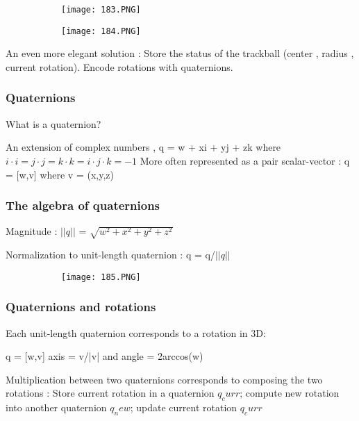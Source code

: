 \documentclass{article}
\begin{document}
\begin{figure}[ht!]
  \centering
  \begin{subfigure}[b]{0.4\linewidth}
    \texttt{[image: 183.PNG]}
  \end{subfigure}
  \begin{subfigure}[b]{0.4\textwidth}
         \centering
         \texttt{[image: 184.PNG]}
     \end{subfigure}
\end{figure}

An even more elegant solution : 
Store the status of the trackball (center , radius , current rotation).
Encode rotations with quaternions.

\subsubsection{Quaternions}

What is a quaternion?

An extension of complex numbers , q = w + xi + yj + zk where $i \cdot i = j \cdot j = k \cdot k = i \cdot j \cdot k = -1$
More often represented as a pair scalar-vector : q = [w,v] where v = (x,y,z)


\subsubsection{The algebra of quaternions}

Magnitude : $||q||$ = $\sqrt{w^2 + x^2 + y^2 + z^2}$

Normalization to unit-length quaternion : q = q/$||q||$


\begin{figure}[ht!]
  \centering
  \begin{subfigure}[b]{0.55\linewidth}
    \texttt{[image: 185.PNG]}
  \end{subfigure}
\end{figure}


\subsubsection{Quaternions and rotations}

Each unit-length quaternion corresponds to a rotation in 3D: 

q = [w,v] axis = v/|v| and angle = 2arccos(w)

Multiplication between two quaternions corresponds to composing the two rotations : Store current rotation in a quaternion $q_curr$; compute new rotation into another quaternion $q_new$; update current rotation $q_curr$ 
\end{document}
